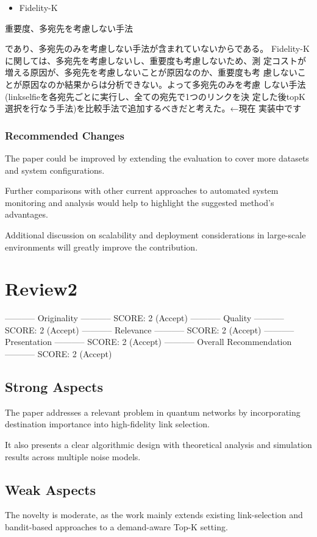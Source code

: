 \documentclass[conference]{IEEEtran}
\begin{document}
\begin{itemize}
\item Fidelity-K
\end{itemize}
重要度、多宛先を考慮しない手法

であり、多宛先のみを考慮しない手法が含まれていないからである。
Fidelity-Kに関しては、多宛先を考慮しないし、重要度も考慮しないため、測
定コストが増える原因が、多宛先を考慮しないことが原因なのか、重要度も考
慮しないことが原因なのか結果からは分析できない。よって多宛先のみを考慮
しない手法(linkselfieを各宛先ごとに実行し、全ての宛先で1つのリンクを決
定した後topK選択を行なう手法)を比較手法で追加するべきだと考えた。←現在
実装中です


\subsubsection{Recommended Changes}
\label{sec:orgb945add}
The paper could be improved by extending the evaluation to cover more
datasets and system configurations.

Further comparisons with other current approaches to automated system
monitoring and analysis would help to highlight the suggested method's
advantages.

Additional discussion on scalability and deployment considerations in
large-scale environments will greatly improve the contribution.


\section{Review2}
\label{sec:org89bae97}
----------- Originality -----------
SCORE: 2 (Accept)
----------- Quality -----------
SCORE: 2 (Accept)
----------- Relevance -----------
SCORE: 2 (Accept)
----------- Presentation -----------
SCORE: 2 (Accept)
----------- Overall Recommendation -----------
SCORE: 2 (Accept)

\subsection{Strong Aspects}
\label{sec:org6d3d609}
The paper addresses a relevant problem in quantum networks by
incorporating destination importance into high-fidelity link
selection.

It also presents a clear algorithmic design with theoretical analysis
and simulation results across multiple noise models.

\subsection{Weak Aspects}
\label{sec:orgb52d8d1}
The novelty is moderate, as the work mainly extends existing
link-selection and bandit-based approaches to a demand-aware Top-K
setting.
\end{document}
